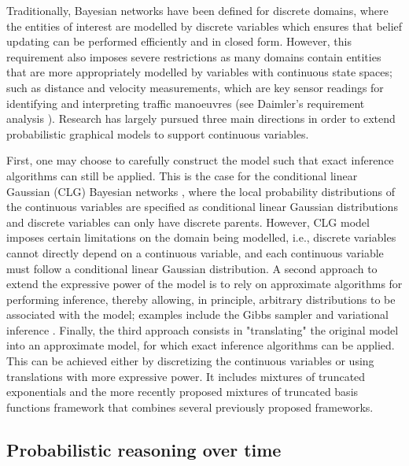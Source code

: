 Traditionally, Bayesian networks have been defined for discrete domains, where the entities of interest are modelled by discrete variables which ensures that belief updating can be performed efficiently and in closed form. However, this requirement also imposes severe restrictions as many domains contain entities that are more appropriately modelled by variables with continuous state spaces; such as distance and velocity measurements, which are key sensor readings for identifying and interpreting traffic manoeuvres (see Daimler's requirement analysis \cite{Fer14}). Research has largely pursued three main directions in order to extend probabilistic graphical models to support continuous variables. 

First, one may choose to carefully construct the model such that exact inference algorithms can still be applied. This is the case for the conditional linear Gaussian (CLG) Bayesian networks \cite{Lauritzen1992,LauritzenJensen2001}, where the local probability distributions of the continuous variables are specified as conditional linear Gaussian distributions and discrete variables can only have discrete parents. However, CLG model imposes certain limitations on the domain being modelled, i.e., discrete variables cannot directly depend on a continuous variable, and each continuous variable must follow a conditional linear Gaussian distribution. A second approach to extend the expressive power of the model is to rely on approximate algorithms for performing inference, thereby allowing, in principle, arbitrary distributions to be associated with the model; examples include the Gibbs sampler \cite{Geman1984, hrycej1990gibbs} and variational inference \cite{Jordan1999}. Finally, the third approach consists in "translating" the original model into an approximate model, for which exact inference algorithms can be applied. This can be achieved either by discretizing the continuous variables \cite{KozlovKollerUAI97} or using translations with more expressive power. It includes mixtures of truncated exponentials \cite{Moral2001} and the more recently proposed mixtures of truncated basis functions framework \cite{Langseth12} that combines several previously proposed frameworks.

\subsection{Probabilistic reasoning over time}\label{SubSection:DBNs}

